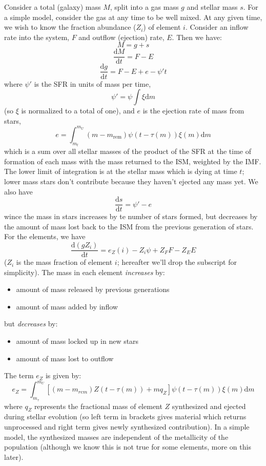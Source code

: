 \documentclass{article}
\begin{document}
Consider a total (galaxy) mass $M$, split into a gas mass
$g$ and stellar mass $s$. For a simple model, consider the
gas at any time to be well mixed. At any given time, we wish
to know the fraction abundance ($Z_{i}$) of element $i$.
Consider an inflow rate into the system, $F$ and outflow
(ejection) rate, $E$. Then we have:
\[
    M = g + s
\]\[
    \frac{\mathrm{d}M}{\mathrm{d}t} = F - E
\]\[
    \frac{\mathrm{d}g}{\mathrm{d}t} = F - E + e - \psi't
\]
where $\psi'$ is the SFR in units of mass per time,
\[
    \psi' = \psi\int\xi\textrm{d}m
\]
(so $\xi$ is normalized to a total of one), and $e$ is the
ejection rate of mass from stars,
\[
    e = \int_{m_{t}}^{m_{U}}{
        \left(m-m_{\mathrm{rem}}\right)\psi\left(t-\tau(m)\right)
        \xi\left(m\right)\mathrm{d}m}
\]
which is a sum over all stellar masses of the product of the SFR at the time of
formation of each mass with the mass returned to the ISM, weighted by the
IMF\@. The lower limit of integration is at the stellar mass which is dying at
time $t$; lower mass stars don't contribute because they haven't ejected any
mass yet.  We also have
\[
    \frac{\mathrm{d}s}{\mathrm{d}t} = \psi' - e
\]
wince the mass in stars increases by te number of stars formed,
but decreases by the amount of mass lost back to the ISM from
the previous generation of stars. For the elements, we have
\[
    \frac{\mathrm{d}(gZ_{i})}{\mathrm{d}t} =
    e_{Z}(i) - Z_{i}\psi + Z_{F}F - Z_{E}E
\]
($Z_i$ is the mass fraction of element $i$; hereafter we'll drop
the subscript for simplicity). The mass in each element
\emph{increases} by:
\begin{itemize}
    \item amount of mass released by previous generations
    \item amount of mass added by inflow
\end{itemize}
but \emph{decreases} by:
\begin{itemize}
    \item amount of mass locked up in new stars
    \item amount of mass lost to outflow
\end{itemize}
The term $e_{Z}$ is given by:
\[
    e_{Z} = \int_{m_{\tau}}^{m_{U}}{
        \left[(m-m_{rem})Z(t-\tau(m))+mq_{Z}\right]
        \psi(t-\tau(m))\xi(m)\textrm{d}m}
\]
where $q_{Z}$ represents the fractional mass of element $Z$ synthesized and
ejected during stellar evolution (so left term in brackets gives material which
returns unprocessed and right term gives newly synthesized contribution).  In a
simple model, the synthesized masses are independent of the metallicity of the
population (although we know this is not true for some elements, more on this
later).
\end{document}
